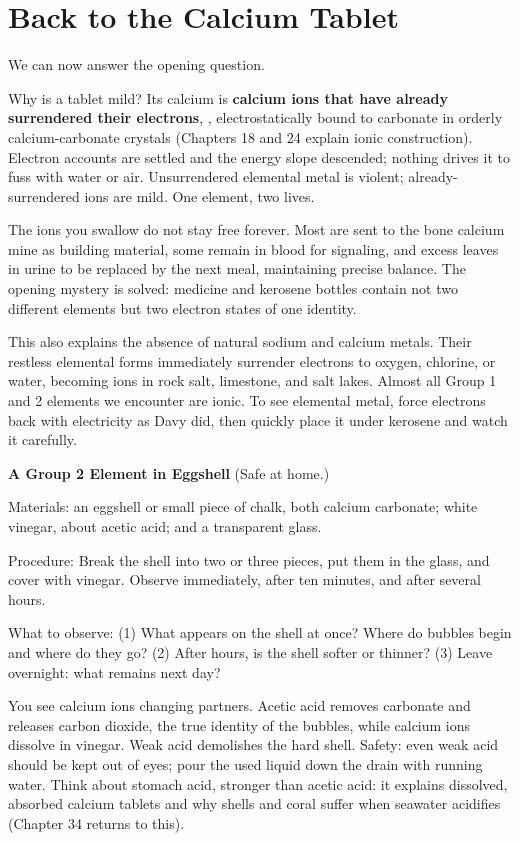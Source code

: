 \section{Back to the Calcium Tablet}

We can now answer the opening question.

Why is a tablet mild? Its calcium is \textbf{calcium ions that have already surrendered their electrons}, , electrostatically bound to carbonate  in orderly calcium-carbonate crystals (Chapters 18 and 24 explain ionic construction). Electron accounts are settled and the energy slope descended; nothing drives it to fuss with water or air. Unsurrendered elemental metal is violent; already-surrendered ions are mild. One element, two lives.

The ions you swallow do not stay free forever. Most are sent to the bone calcium mine as building material, some remain in blood for signaling, and excess leaves in urine to be replaced by the next meal, maintaining precise balance. The opening mystery is solved: medicine and kerosene bottles contain not two different elements but two electron states of one identity.

This also explains the absence of natural sodium and calcium metals. Their restless elemental forms immediately surrender electrons to oxygen, chlorine, or water, becoming ions in rock salt, limestone, and salt lakes. Almost all Group 1 and 2 elements we encounter are ionic. To see elemental metal, force electrons back with electricity as Davy did, then quickly place it under kerosene and watch it carefully.

\begin{shiyan}
\textbf{A Group 2 Element in Eggshell} (Safe at home.)

Materials: an eggshell or small piece of chalk, both calcium carbonate; white vinegar, about  acetic acid; and a transparent glass.

Procedure: Break the shell into two or three pieces, put them in the glass, and cover with vinegar. Observe immediately, after ten minutes, and after several hours.

What to observe: (1) What appears on the shell at once? Where do bubbles begin and where do they go? (2) After hours, is the shell softer or thinner? (3) Leave overnight: what remains next day?

You see calcium ions changing partners. Acetic acid removes carbonate and releases carbon dioxide, the true identity of the bubbles, while calcium ions dissolve in vinegar. Weak acid demolishes the hard shell. Safety: even weak acid should be kept out of eyes; pour the used liquid down the drain with running water. Think about stomach acid, stronger than acetic acid: it explains dissolved, absorbed calcium tablets and why shells and coral suffer when seawater acidifies (Chapter 34 returns to this).
\end{shiyan}


